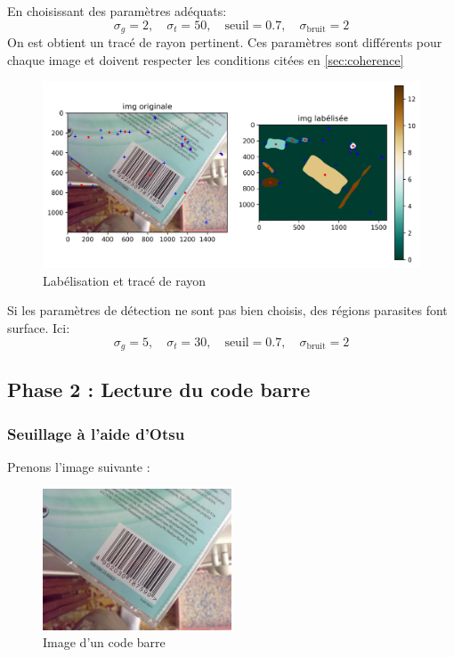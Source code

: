 \documentclass{rapport}
\newcommand{\figsize}{1\textwidth}
\begin{document}
En choisissant des paramètres adéquats:
$$\sigma_g = 2, \quad \sigma_t = 50, \quad \text{seuil} = 0.7, \quad \sigma_{\text{bruit}} = 2$$
On est obtient un tracé de rayon pertinent.
\newline Ces paramètres sont différents pour chaque image et doivent respecter les conditions citées en \ref{sec:coherence}
\begin{figure}[H]  
	\centering
	\includegraphics[width=\figsize]{images/Detection/manyblobs.png}
	\caption{Labélisation et tracé de rayon}
	\label{seuil}
\end{figure}
Si les paramètres de détection ne sont pas bien choisis, des régions parasites font surface. Ici:
$$\sigma_g = 5, \quad \sigma_t = 30, \quad \text{seuil} = 0.7, \quad \sigma_{\text{bruit}} = 2$$

\subsection{Phase 2 : Lecture du code barre}

\subsubsection*{Seuillage à l'aide d'Otsu}
Prenons l'image suivante :
\begin{figure}[H] %
	\centering
	\includegraphics[width=0.5\textwidth]{images/barcode0.jpg}
	\caption{Image d'un code barre}
	\label{code_barre}
\end{figure}
\end{document}
